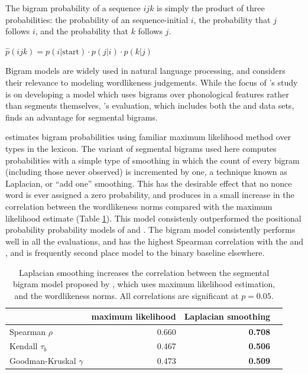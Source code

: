 The bigram probability of a sequence $ijk$ is simply the product of three probabilities: the probability of an sequence-initial $i$, the probability that $j$ follows $i$, and the probability that $k$ follows $j$.

\begin{unlabeledexample}
$\displaystyle \hat{p}(ijk) = p(i|\textrm{start}) \cdot p(j|i) \cdot p(k|j)$
\end{unlabeledexample}

\noindent Bigram models are widely used in natural language processing, and \citet{Albright2009a} considers their relevance to modeling wordlikeness judgements. While the focus of \citeauthor{Albright2009a}'s study is on developing a model which uses bigrams over phonological features rather than segments themselves, \citeauthor{Albright2009a}'s evaluation, which includes both the \citeauthor{Scholes1966} and \citeauthor{Albright2003b} data sets, finds an advantage for segmental bigrams. 

\citeauthor{Albright2009a} estimates bigram probabilities using familiar maximum likelihood method over types in the lexicon. The variant of segmental bigrams used here computes probabilities with a simple type of smoothing in which the count of every bigram (including those never observed) is incremented by one, a technique known as Laplacian, or ``add one'' smoothing. This has the desirable effect that no nonce word is ever assigned a zero probability, and produces in a small increase in the correlation between the \citeauthor{Albright2003b} wordlikeness norms compared with the maximum likelihood estimate (Table \ref{albrightimproved}). This model consistenly outperformed the positional probability probability models of \citet{Vitevitch2004} and \citet{Vaden2009}. The bigram model consistently performs well in all the evaluations, and has the highest Spearman correlation with the \citeauthor{Greenberg1964} and \citeauthor{Scholes1966}, and is frequently second place model to the binary baseline elsewhere.

\begin{table} \label{albrightimproved}
\centering
\begin{tabular}{l r r r}
\toprule
                         & maximum likelihood & Laplacian smoothing \\
\midrule
Spearman $\rho$          & 0.660              & \textbf{0.708} \\
Kendall $\tau_b$         & 0.467              & \textbf{0.506} \\
Goodman-Kruskal $\gamma$ & 0.473              & \textbf{0.509} \\
\bottomrule
\end{tabular}
\caption{Laplacian smoothing increases the correlation between the segmental bigram model proposed by \citet{Albright2009a}, which uses maximum likelihood estimation, and the \citet{Albright2003b} wordlikeness norms. All correlations are significant at $p = 0.05$.}
\end{table}

